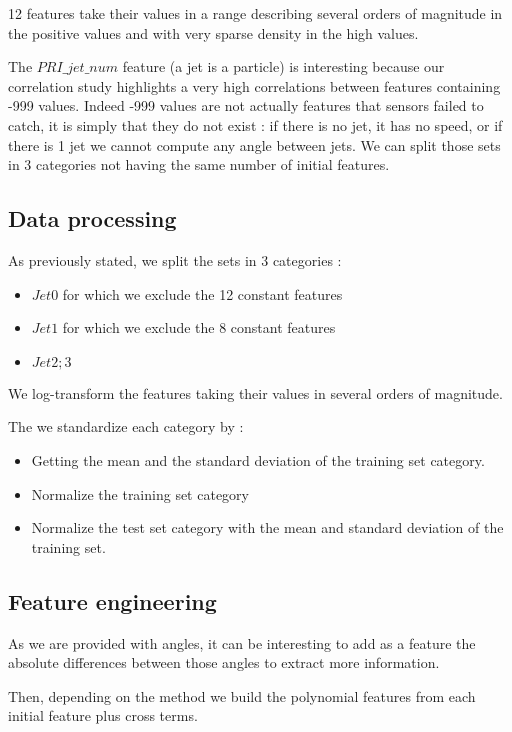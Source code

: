 \documentclass[10pt,conference,compsocconf]{IEEEtran}
\begin{document}
12 features take their values in a range describing several orders of magnitude in the positive values and with very sparse density in the high values.

The $PRI\_jet\_num$ feature (a jet is a particle) is interesting because our correlation study highlights a very high correlations between features containing -999 values. Indeed -999 values are not actually features that sensors failed to catch, it is simply that they do not exist : if there is no jet, it has no speed, or if there is 1 jet we cannot compute any angle between jets. We can split those sets in 3 categories not having the same number of initial features. 

\subsection{Data processing}

As previously stated, we split the sets in 3 categories : 
\begin{itemize}
    \item $Jet0$ for which we exclude the 12 constant features
    \item $Jet1$ for which we exclude the 8 constant features
    \item $Jet{2;3}$ 
\end{itemize}

We log-transform the features taking their values in several orders of magnitude.

The we standardize each category by :
\begin{itemize}
    \item Getting the mean and the standard deviation of the training set category.
    \item Normalize the training set category
    \item Normalize the test set category with the mean and standard deviation of the training set.
\end{itemize}

\subsection{Feature engineering}

As we are provided with angles, it can be interesting to add as a feature the absolute differences between those angles to extract more information.

Then, depending on the method we build the polynomial features from each initial feature plus cross terms.
\end{document}
